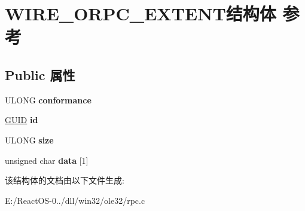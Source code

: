 \hypertarget{struct_w_i_r_e___o_r_p_c___e_x_t_e_n_t}{}\section{W\+I\+R\+E\+\_\+\+O\+R\+P\+C\+\_\+\+E\+X\+T\+E\+N\+T结构体 参考}
\label{struct_w_i_r_e___o_r_p_c___e_x_t_e_n_t}
\subsection*{Public 属性}
\begin{DoxyCompactItemize}
\item 
\mbox{\label{struct_w_i_r_e___o_r_p_c___e_x_t_e_n_t_af97b21e29734daf64006deca7d0f0f4e}} 
U\+L\+O\+NG {\bfseries conformance}
\item 
\mbox{\label{struct_w_i_r_e___o_r_p_c___e_x_t_e_n_t_a76ecb302610a6dfb871b47673887b4e6}} 
\hyperlink{interface_g_u_i_d}{G\+U\+ID} {\bfseries id}
\item 
\mbox{\label{struct_w_i_r_e___o_r_p_c___e_x_t_e_n_t_a438ebb324e1ea0a32332164fbb3c9ec5}} 
U\+L\+O\+NG {\bfseries size}
\item 
\mbox{\label{struct_w_i_r_e___o_r_p_c___e_x_t_e_n_t_aa78cd81b17f3b3911c9334ff4c679138}} 
unsigned char {\bfseries data} \mbox{[}1\mbox{]}
\end{DoxyCompactItemize}


该结构体的文档由以下文件生成\+:\begin{DoxyCompactItemize}
\item 
E\+:/\+React\+O\+S-\/0../dll/win32/ole32/rpc.\+c\end{DoxyCompactItemize}
